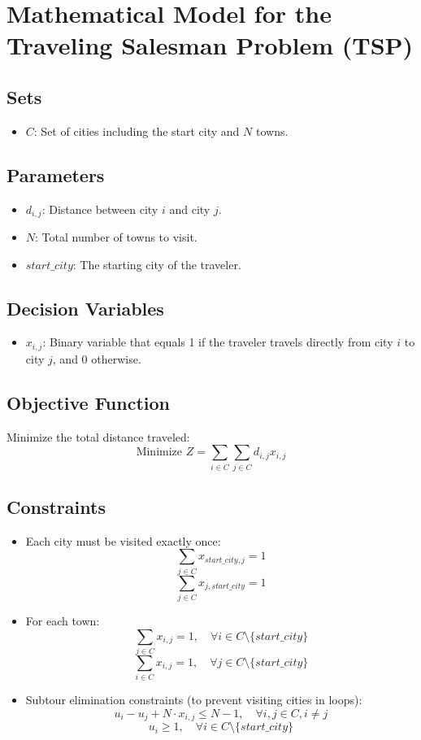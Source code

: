 \documentclass{article}
\begin{document}
\section*{Mathematical Model for the Traveling Salesman Problem (TSP)}

\subsection*{Sets}
\begin{itemize}
    \item \( C \): Set of cities including the start city and \( N \) towns.
\end{itemize}

\subsection*{Parameters}
\begin{itemize}
    \item \( d_{i,j} \): Distance between city \( i \) and city \( j \).
    \item \( N \): Total number of towns to visit.
    \item \( start\_city \): The starting city of the traveler.
\end{itemize}

\subsection*{Decision Variables}
\begin{itemize}
    \item \( x_{i,j} \): Binary variable that equals 1 if the traveler travels directly from city \( i \) to city \( j \), and 0 otherwise.
\end{itemize}

\subsection*{Objective Function}
Minimize the total distance traveled:
\[
\text{Minimize } Z = \sum_{i \in C} \sum_{j \in C} d_{i,j} x_{i,j}
\]

\subsection*{Constraints}
\begin{itemize}
    \item Each city must be visited exactly once:
    \[
    \sum_{j \in C} x_{start\_city,j} = 1
    \]
    \[
    \sum_{j \in C} x_{j,start\_city} = 1
    \]
    \item For each town:
    \[
    \sum_{j \in C} x_{i,j} = 1, \quad \forall i \in C \setminus \{start\_city\}
    \]
    \[
    \sum_{i \in C} x_{i,j} = 1, \quad \forall j \in C \setminus \{start\_city\}
    \]
    \item Subtour elimination constraints (to prevent visiting cities in loops):
    \[
    u_i - u_j + N \cdot x_{i,j} \leq N-1, \quad \forall i,j \in C, i \neq j
    \]
    \[
    u_i \geq 1, \quad \forall i \in C \setminus \{start\_city\}
    \]
\end{itemize}
\end{document}
